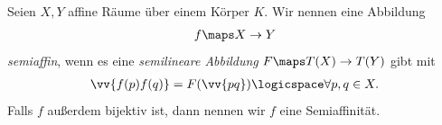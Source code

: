 \begin{definition*}
    Seien \( X,Y \) affine Räume über einem Körper \( K \). Wir nennen eine Abbildung
    \begin{align*}
        f\maps X\to Y
    \end{align*}
    \emph{semiaffin}, wenn es eine \emph{semilineare Abbildung} \( F\maps T(X)\to T(Y) \) gibt mit
    \begin{align*}
        \vv{f(p) f(q)}=F(\vv{pq})\logicspace \forall p,q\in X.
    \end{align*}
    Falls \( f \) außerdem bijektiv ist, dann nennen wir \( f \) eine Semiaffinität.
\end{definition*}